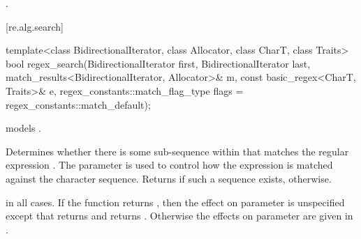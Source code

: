 \begin{itemdescr}
\pnum
\returns
{}.
\end{itemdescr}

[re.alg.search]{}

%
\begin{itemdecl}
template<class BidirectionalIterator, class Allocator, class CharT, class Traits>
  bool regex_search(BidirectionalIterator first, BidirectionalIterator last,
                    match_results<BidirectionalIterator, Allocator>& m,
                    const basic_regex<CharT, Traits>& e,
                    regex_constants::match_flag_type flags = regex_constants::match_default);
\end{itemdecl}

\begin{itemdescr}
\pnum
\expects
{} models
.

\pnum
\effects
Determines whether there is some sub-sequence within  that matches
the regular expression . The parameter  is used to control how the
expression is matched against the character sequence. Returns  if such a sequence
exists,  otherwise.

\pnum
\ensures
{} in all cases.
If the function returns , then the effect
on parameter  is unspecified except that 
returns  and  returns .  Otherwise
the effects on parameter  are given in .
\end{itemdescr}


